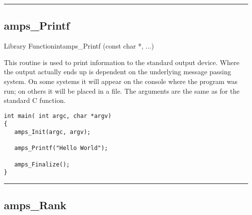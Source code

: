 
\noindent\rule{\textwidth}{1mm}

\subsection{amps\_Printf}
\label{amps_Printf}


\begin{deftypefn}{Library Function}{int}{amps\_Printf}
                 (const char *, ...)

\DESCRIPTION

This routine is used to print information to the standard output device.
Where the output actually ends up is dependent on the underlying message
passing system.  On some systems it will appear on the console where the
program was run; on others it will be placed in a file.  The arguments
are the same as for the standard C  function.

\EXAMPLE
\begin{display}\begin{verbatim}
int main( int argc, char *argv)
{
   amps_Init(argc, argv);
   
   amps_Printf("Hello World");

   amps_Finalize();
}
\end{verbatim}\end{display}

\end{deftypefn}


\noindent\rule{\textwidth}{1mm}

\subsection{amps\_Rank}
\label{amps_Rank}


